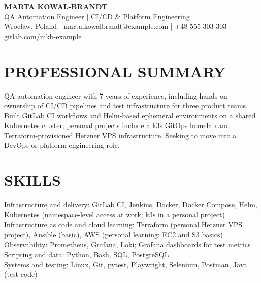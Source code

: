 \documentclass[11pt,a4paper]{article}
\begin{document}
\begin{center}
{\LARGE\bfseries\color{primarycolor} MARTA KOWAL-BRANDT}\\
QA Automation Engineer | CI/CD \& Platform Engineering\\
Wroclaw, Poland | marta.kowalbrandt@example.com | +48 555 303 303 | gitlab.com/mkb-example
\end{center}

\section*{PROFESSIONAL SUMMARY}
QA automation engineer with 7 years of experience, including hands-on ownership of CI/CD pipelines and test infrastructure for three product teams. Built GitLab CI workflows and Helm-based ephemeral environments on a shared Kubernetes cluster; personal projects include a k3s GitOps homelab and Terraform-provisioned Hetzner VPS infrastructure. Seeking to move into a DevOps or platform engineering role.

\section*{SKILLS}
Infrastructure and delivery: GitLab CI, Jenkins, Docker, Docker Compose, Helm, Kubernetes (namespace-level access at work; k3s in a personal project)\\
Infrastructure as code and cloud learning: Terraform (personal Hetzner VPS project), Ansible (basic), AWS (personal learning: EC2 and S3 basics)\\
Observability: Prometheus, Grafana, Loki; Grafana dashboards for test metrics\\
Scripting and data: Python, Bash, SQL, PostgreSQL\\
Systems and testing: Linux, Git, pytest, Playwright, Selenium, Postman, Java (test code)
\end{document}
